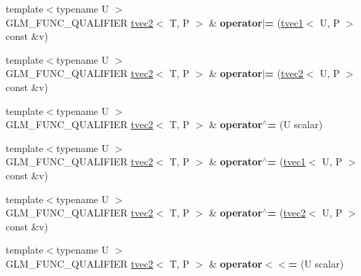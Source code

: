 \begin{DoxyCompactItemize}
\item 
\hypertarget{structglm_1_1tvec2_a843e403f0c04d10bcbe3a7ffe63454b9}{{\footnotesize template$<$typename U $>$ }\\G\-L\-M\-\_\-\-F\-U\-N\-C\-\_\-\-Q\-U\-A\-L\-I\-F\-I\-E\-R \hyperlink{structglm_1_1tvec2}{tvec2}$<$ T, P $>$ \& {\bfseries operator$\vert$=} (\hyperlink{structglm_1_1tvec1}{tvec1}$<$ U, P $>$ const \&v)}\label{structglm_1_1tvec2_a843e403f0c04d10bcbe3a7ffe63454b9}

\item 
\hypertarget{structglm_1_1tvec2_aa36fb52ee5d9c58525c1e82edfdadc70}{{\footnotesize template$<$typename U $>$ }\\G\-L\-M\-\_\-\-F\-U\-N\-C\-\_\-\-Q\-U\-A\-L\-I\-F\-I\-E\-R \hyperlink{structglm_1_1tvec2}{tvec2}$<$ T, P $>$ \& {\bfseries operator$\vert$=} (\hyperlink{structglm_1_1tvec2}{tvec2}$<$ U, P $>$ const \&v)}\label{structglm_1_1tvec2_aa36fb52ee5d9c58525c1e82edfdadc70}

\item 
\hypertarget{structglm_1_1tvec2_a5026bdfe8ccedecefd92963b117b33d3}{{\footnotesize template$<$typename U $>$ }\\G\-L\-M\-\_\-\-F\-U\-N\-C\-\_\-\-Q\-U\-A\-L\-I\-F\-I\-E\-R \hyperlink{structglm_1_1tvec2}{tvec2}$<$ T, P $>$ \& {\bfseries operator$^\wedge$=} (U scalar)}\label{structglm_1_1tvec2_a5026bdfe8ccedecefd92963b117b33d3}

\item 
\hypertarget{structglm_1_1tvec2_a2b88448c05b92b3a1f32b19f0698a53a}{{\footnotesize template$<$typename U $>$ }\\G\-L\-M\-\_\-\-F\-U\-N\-C\-\_\-\-Q\-U\-A\-L\-I\-F\-I\-E\-R \hyperlink{structglm_1_1tvec2}{tvec2}$<$ T, P $>$ \& {\bfseries operator$^\wedge$=} (\hyperlink{structglm_1_1tvec1}{tvec1}$<$ U, P $>$ const \&v)}\label{structglm_1_1tvec2_a2b88448c05b92b3a1f32b19f0698a53a}

\item 
\hypertarget{structglm_1_1tvec2_a97ae34925859e7738cf400ecc4880190}{{\footnotesize template$<$typename U $>$ }\\G\-L\-M\-\_\-\-F\-U\-N\-C\-\_\-\-Q\-U\-A\-L\-I\-F\-I\-E\-R \hyperlink{structglm_1_1tvec2}{tvec2}$<$ T, P $>$ \& {\bfseries operator$^\wedge$=} (\hyperlink{structglm_1_1tvec2}{tvec2}$<$ U, P $>$ const \&v)}\label{structglm_1_1tvec2_a97ae34925859e7738cf400ecc4880190}

\item 
\hypertarget{structglm_1_1tvec2_a6afc7e45c6438990e7cd48b03369e79c}{{\footnotesize template$<$typename U $>$ }\\G\-L\-M\-\_\-\-F\-U\-N\-C\-\_\-\-Q\-U\-A\-L\-I\-F\-I\-E\-R \hyperlink{structglm_1_1tvec2}{tvec2}$<$ T, P $>$ \& {\bfseries operator$<$$<$=} (U scalar)}\label{structglm_1_1tvec2_a6afc7e45c6438990e7cd48b03369e79c}


\end{DoxyCompactItemize}
